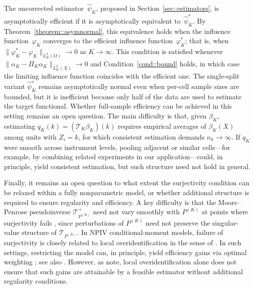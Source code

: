 \documentclass[11pt]{article}
\theoremstyle{plain}
\theoremstyle{definition}
\theoremstyle{remark}
\theoremstyle{definition}
\begin{document}
The uncorrected estimator~\(\widehat{\psi}_K\), proposed in
Section~\ref{sec::estimators}, is asymptotically efficient if it is
asymptotically equivalent to~\(\widehat{\psi}_K^*\). By
Theorem~\ref{theorem::asymnormal}, this equivalence holds when the influence
function~\(\varphi_K\) converges to the efficient influence
function~\(\varphi_K^*\); that is, when
\(\|\varphi_K^* - \varphi_K\|_{L^2_K(O)} \to 0\) as \(K \to \infty\). This
condition is satisfied whenever
\(\|\alpha_K - \Pi_K \alpha_K\|_{L^2_K(X)} \to 0\) and
Condition~\ref{cond::bound} holds, in which case the limiting influence
function coincides with the efficient one. The single-split variant
\(\widehat{\psi}_K^\diamond\) remains asymptotically normal even when per-cell
sample sizes are bounded, but it is inefficient because only half of the data
are used to estimate the target functional. Whether full-sample efficiency can
be achieved in this setting remains an open question. The main difficulty is
that, given \(\beta_K\), estimating \(q_K(k) = (\mathcal{T}_K \beta_K)(k)\)
requires empirical averages of \(\beta_K(X)\) among units with \(Z_i = k\), for
which consistent estimation demands \(n_k \to \infty\). If \(q_K\) were smooth
across instrument levels, pooling adjacent or similar cells---for example, by
combining related experiments in our application---could, in principle, yield
consistent estimation, but such structure need not hold in general.

Finally, it remains an open question to what extent the surjectivity condition
can be relaxed within a fully nonparametric model, or whether additional
structure is required to ensure regularity and efficiency. A key difficulty is
that the Moore--Penrose pseudoinverse \(\mathcal{T}_{P^{(K)}}^{+}\) need not
vary smoothly with \(P^{(K)}\) at points where surjectivity fails
\citep{stewart1977perturbation}, since perturbations of \(P^{(K)}\) need not
preserve the singular-value structure of \(\mathcal{T}_{P^{(K)}}\). In NPIV
conditional-moment models, failure of surjectivity is closely related to local
overidentification in the sense of \citet[Theorem~4.1]{chen2018overidentification}.
In such settings, restricting the model can, in principle, yield efficiency
gains via optimal weighting \citep[Theorem~3.1]{chen2018overidentification}; see
also \citet{ai2003efficient, ai2012semiparametric, florens2024optimal,
chen2025local}. However, as \citet[p.~3]{chen2018overidentification} note, local
overidentification alone does not ensure that such gains are attainable by a
feasible estimator without additional regularity conditions.
\end{document}
